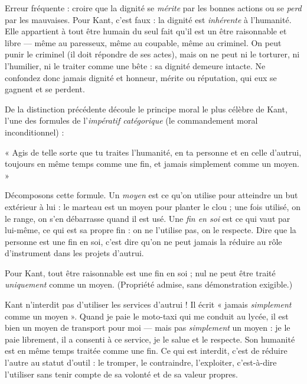 \documentclass[11pt]{article}
\newcommand{\cle}[1]{{\popxbold\color{popdark}#1}}
\newcounter{popsec}
\newcounter{popsub}
\newcommand{\courssub}[1]{%
  \stepcounter{popsub}%
  \par\vspace{9pt}\noindent{\popxbold\fontsize{11.5}{13}\selectfont\color{popink}{\color{poporange}\thepopsec.\thepopsub}\hspace{6pt}#1}\par\nopagebreak\vspace{4pt}
}
\begin{document}
\begin{attention}
Erreur fréquente : croire que la dignité se \emph{mérite} par les bonnes actions ou se \emph{perd} par les mauvaises. Pour Kant, c'est faux : la dignité est \emph{inhérente} à l'humanité. Elle appartient à tout être humain du seul fait qu'il est un être raisonnable et libre — même au paresseux, même au coupable, même au criminel. On peut punir le criminel (il doit répondre de ses actes), mais on ne peut ni le torturer, ni l'humilier, ni le traiter comme une bête : sa dignité demeure intacte. Ne confondez donc jamais dignité et honneur, mérite ou réputation, qui eux se gagnent et se perdent.
\end{attention}

\courssub{La personne comme fin en soi}

De la distinction précédente découle le principe moral le plus célèbre de Kant, l'une des formules de l'\emph{impératif catégorique} (le commandement moral inconditionnel) :

\begin{aretenir}
« Agis de telle sorte que tu traites l'humanité, en ta personne et en celle d'autrui, toujours en même temps comme une \cle{fin}, et jamais simplement comme un \cle{moyen}. »
\end{aretenir}

Décomposons cette formule. Un \emph{moyen} est ce qu'on utilise pour atteindre un but extérieur à lui : le marteau est un moyen pour planter le clou ; une fois utilisé, on le range, on s'en débarrasse quand il est usé. Une \emph{fin en soi} est ce qui vaut par lui-même, ce qui est sa propre fin : on ne l'utilise pas, on le respecte. Dire que la personne est une fin en soi, c'est dire qu'on ne peut jamais la réduire au rôle d'instrument dans les projets d'autrui.

\begin{propriete}
Pour Kant, tout être raisonnable est une fin en soi ; nul ne peut être traité \emph{uniquement} comme un moyen. (Propriété admise, sans démonstration exigible.)
\end{propriete}

\begin{attention}
Kant n'interdit pas d'utiliser les services d'autrui ! Il écrit « jamais \emph{simplement} comme un moyen ». Quand je paie le moto-taxi qui me conduit au lycée, il est bien un moyen de transport pour moi — mais pas \emph{simplement} un moyen : je le paie librement, il a consenti à ce service, je le salue et le respecte. Son humanité est en même temps traitée comme une fin. Ce qui est interdit, c'est de réduire l'autre au statut d'outil : le tromper, le contraindre, l'exploiter, c'est-à-dire l'utiliser sans tenir compte de sa volonté et de sa valeur propres.
\end{attention}
\end{document}
